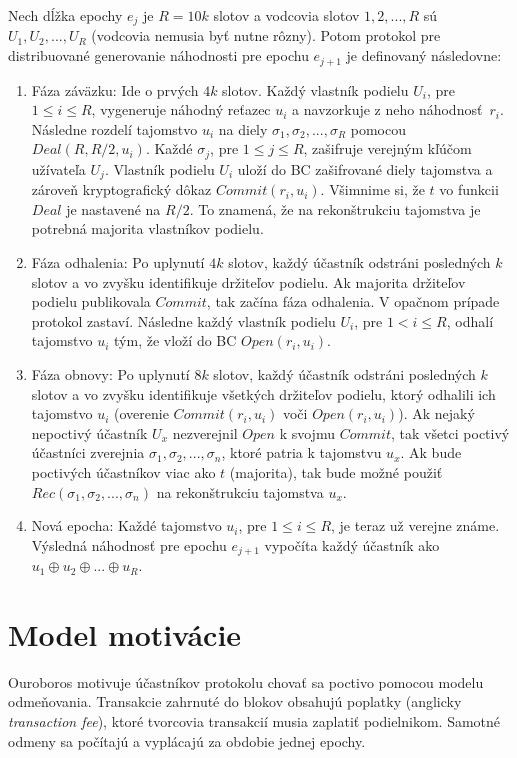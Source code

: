 Nech dĺžka epochy $e_j$ je $R=10k$ slotov a vodcovia slotov $1,2,...,R$ sú $U_1, U_2, ..., U_R$ (vodcovia nemusia byť nutne rôzny). Potom protokol pre distribuované generovanie náhodnosti pre epochu $e_{j+1}$ je definovaný následovne:
\begin{enumerate}
	\item Fáza záväzku: Ide o prvých $4k$ slotov. Každý vlastník podielu $U_i$, pre $1 \leq i \leq R$, vygeneruje náhodný reťazec $u_i$ a navzorkuje z neho náhodnosť~$r_i$. Následne rozdelí tajomstvo $u_i$ na diely $\sigma_1, \sigma_2, ..., \sigma_R$ pomocou $Deal(R,R/2,u_i)$. Každé $\sigma_j$, pre $1 \leq j \leq R$, zašifruje verejným kľúčom užívateľa $U_j$. Vlastník podielu $U_i$ uloží do BC zašifrované diely tajomstva a zároveň kryptografický dôkaz $Commit(r_i, u_i)$. Všimnime si, že $t$ vo funkcii $Deal$ je nastavené na $R/2$. To znamená, že na rekonštrukciu tajomstva je potrebná majorita vlastníkov podielu.
	\item Fáza odhalenia: Po uplynutí $4k$ slotov, každý účastník odstráni posledných $k$ slotov a vo zvyšku identifikuje držiteľov podielu. Ak majorita držiteľov podielu publikovala $Commit$, tak začína fáza odhalenia. V opačnom prípade protokol zastaví. Následne každý vlastník podielu $U_i$, pre $1 < i \leq R$, odhalí tajomstvo $u_i$ tým, že vloží do BC $Open(r_i, u_i)$.
	\item Fáza obnovy: Po uplynutí $8k$ slotov, každý účastník odstráni posledných $k$ slotov a vo zvyšku identifikuje všetkých držiteľov podielu, ktorý odhalili ich tajomstvo $u_i$ (overenie $Commit(r_i, u_i)$ voči $Open(r_i, u_i)$). Ak nejaký nepoctivý účastník $U_x$ nezverejnil $Open$ k svojmu $Commit$, tak všetci poctivý účastníci zverejnia  $\sigma_1, \sigma_2, ..., \sigma_n$, ktoré patria k tajomstvu $u_x$. Ak bude poctivých účastníkov viac ako $t$ (majorita), tak bude možné použiť $Rec(\sigma_1, \sigma_2, ..., \sigma_n)$ na rekonštrukciu tajomstva $u_x$.
	\item Nová epocha: Každé tajomstvo $u_i$, pre $1 \leq i \leq R$, je teraz už verejne známe. Výsledná náhodnosť pre epochu $e_{j+1}$ vypočíta každý účastník ako $u_1 \oplus u_2 \oplus ... \oplus u_R$.
\end{enumerate}


\section{Model motivácie}

Ouroboros motivuje účastníkov protokolu chovať sa poctivo pomocou modelu odmeňovania. Transakcie zahrnuté do blokov obsahujú poplatky (anglicky \textit{transaction fee}), ktoré tvorcovia transakcií musia zaplatiť podielnikom. Samotné odmeny sa počítajú a vyplácajú za obdobie jednej epochy.


